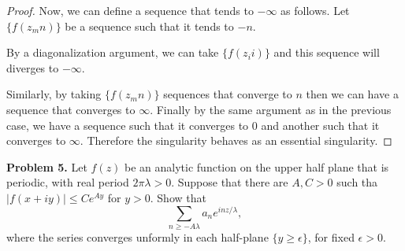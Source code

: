 \documentclass[letterpaper,twoside,11pt]{article}
\begin{document}
\begin{proof}
Now, we can define a sequence that tends to $-\infty$ as follows. Let $\{f(z_mn)\}$ be a sequence such that it tends to $-n$.

By a diagonalization argument, we can take $\{f(z_ii)\}$ and this sequence will diverges to $-\infty$.

Similarly, by taking $\{f(z_mn)\}$ sequences that converge to $n$ then we can have a sequence that converges to $\infty$. Finally by the same argument as in the previous case, we have a sequence such that it converges to 0 and another such that it converges to $\infty$. Therefore the singularity behaves as an essential singularity.   
\end{proof}


\newpage

\textbf{Problem 5.} Let $f(z)$ be an analytic function on the upper half plane that is periodic,
with real period $2\pi\lambda > 0$. Suppose that there are $A,C > 0$ such tha $|f(x + iy)| \leq  Ce^{Ay}$ for $y > 0$.
Show that
\begin{equation}
\sum_{n \geq -A\lambda}a_ne^{inz/\lambda}, \nonumber
\end{equation}
where the series converges unformly in each half-plane $\{y \geq \epsilon\}$, for fixed $\epsilon > 0$.
\end{document}
